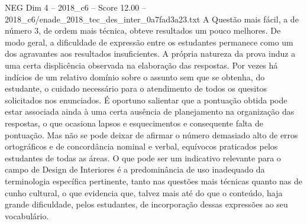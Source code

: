 \begin{textsample}{NEG Dim 4 – 2018\_c6 – Score 12.00 – 2018\_c6/enade\_2018\_tec\_des\_inter\_0a7fad3a23.txt}
A Questão mais fácil, a de número 3, de ordem mais técnica, obteve resultados um pouco melhores.
De modo geral, a dificuldade de expressão entre os estudantes permanece como um dos agravantes aos resultados insuficientes.
A própria natureza da prova induz a uma certa displicência observada na elaboração das respostas.
Por vezes há indícios de um relativo domínio sobre o assunto sem que se obtenha, do estudante, o cuidado necessário para o atendimento de todos os quesitos solicitados nos enunciados.
É oportuno salientar que a pontuação obtida pode estar associada ainda à uma certa ausência de planejamento na organização das respostas, o que ocasiona lapsos e esquecimentos e consequente falta de pontuação.
Mas não se pode deixar de afirmar o número demasiado alto de erros ortográficos e de concordância nominal e verbal, equívocos praticados pelos estudantes de todas as áreas.
O que pode ser um indicativo relevante para o campo de Design de Interiores é a predominância de uso inadequado da terminologia específica pertinente, tanto nas questões mais técnicas quanto nas de cunho cultural, o que evidencia que, talvez mais até do que o conteúdo, haja grande dificuldade, pelos estudantes, de incorporação dessas expressões ao seu vocabulário.

\end{textsample}
